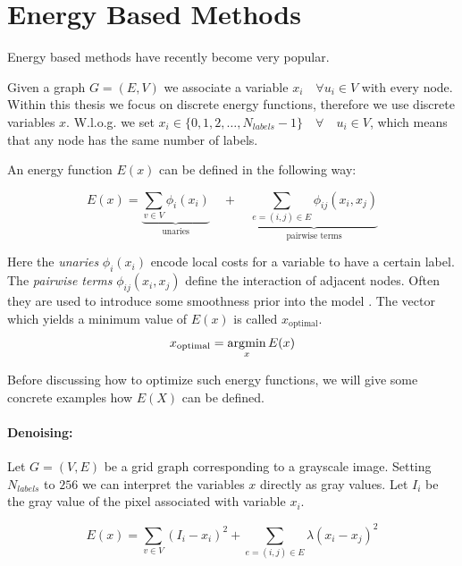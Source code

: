 \section{Energy Based Methods}\label{sec:energy_based_methods}

Energy based methods have recently become very popular.

Given a graph $G = (E,V)$ we 
associate  a variable $ x_i \quad \forall  u_i \in V$ with every node.
Within this thesis we focus on discrete energy functions,
therefore we use discrete variables $x$.
W.l.o.g. we set  $ x_i   \in \{ 0,1,2,\ldots, N_{labels}-1 \} \quad \forall \quad u_i \in V$,
which means that any node has the same number of labels.

An energy function $E(x)$ can be  defined  in the following way:

\begin{equation} \label{eq:gm_energy}
    E(x) = 
    \underbrace{
        \sum_{v \in V} \phi_i(x_i)
    }_{\text{unaries}}
     \quad +  \quad
    \underbrace{
        \sum_{e=(i,j) \in E } \phi_{ij}(x_i,x_j) 
    }_{\text{pairwise terms}}
\end{equation}



Here the \emph{unaries} $\phi_i(x_i)$ encode local costs
for a variable to have a certain label.
The \emph{pairwise terms} $\phi_{ij}(x_i,x_j) $ define the interaction of adjacent nodes.
Often they are used to introduce some smoothness prior
into the model \citep{szeliski_2008_pami}.
The vector which yields a minimum value of $E(x)$
is called $x_{\text{optimal}}$.
\begin{equation} \label{eq:gm_argmin}
x_{\text{optimal}} = \operatorname*{\arg\!\min}_{x}  E(x)
\end{equation}

Before discussing how to optimize such energy functions,
we will give some concrete examples how $E(X)$ 
can be defined.



\paragraph{Denoising:}


Let $G=(V,E)$ be a grid graph corresponding to
a grayscale image.
Setting $N_{labels}$ to $256$ we can interpret  the variables $x$ directly as
gray values.
Let $I_i$ be the gray value of the pixel associated with variable $x_i$.

\begin{equation} \label{eq:gm_ef_dension}
E(x) = \sum_{v \in V}  (I_i - x_i)^2 + \sum_{e=(i,j) \in E } \lambda (x_i-x_j)^2
\end{equation}

